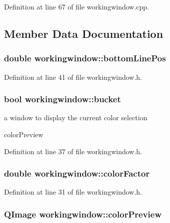 Definition at line 67 of file workingwindow.\-cpp.



\subsection{Member Data Documentation}
\hypertarget{classworkingwindow_a122ed0dce6353c78902353ceeda6bee0}{
\subsubsection[{bottom\-Line\-Pos}]{\setlength{\rightskip}{0pt plus 5cm}double workingwindow\-::bottom\-Line\-Pos}}\label{classworkingwindow_a122ed0dce6353c78902353ceeda6bee0}


Definition at line 41 of file workingwindow.\-h.

\hypertarget{classworkingwindow_a48d7fd2e19079e21a8474ae0519f0862}{
\subsubsection[{bucket}]{\setlength{\rightskip}{0pt plus 5cm}bool workingwindow\-::bucket}}\label{classworkingwindow_a48d7fd2e19079e21a8474ae0519f0862}


a window to display the current color selection 

color\-Preview 

Definition at line 37 of file workingwindow.\-h.

\hypertarget{classworkingwindow_aee9919c1cfad4526c7b66c5f09b8ce02}{
\subsubsection[{color\-Factor}]{\setlength{\rightskip}{0pt plus 5cm}double workingwindow\-::color\-Factor}}\label{classworkingwindow_aee9919c1cfad4526c7b66c5f09b8ce02}


Definition at line 31 of file workingwindow.\-h.

\hypertarget{classworkingwindow_a470b6dd89240fb31393ee848cef5a358}{
\subsubsection[{color\-Preview}]{\setlength{\rightskip}{0pt plus 5cm}Q\-Image workingwindow\-::color\-Preview}}\label{classworkingwindow_a470b6dd89240fb31393ee848cef5a358}


